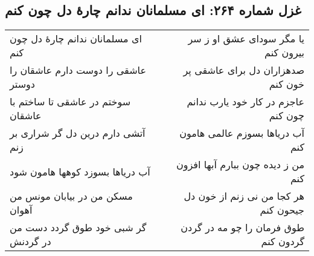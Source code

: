 \begin{center}
\section*{غزل شماره ۲۶۴: ای مسلمانان ندانم چارهٔ دل چون کنم}
\label{sec:264}
\begin{longtable}{l p{0.5cm} r}
ای مسلمانان ندانم چارهٔ دل چون کنم
&&
یا مگر سودای عشق او ز سر بیرون کنم
\\
عاشقی را دوست دارم عاشقان را دوستر
&&
صدهزاران دل برای عاشقی پر خون کنم
\\
سوختم در عاشقی تا ساختم با عاشقان
&&
عاجزم در کار خود یارب ندانم چون کنم
\\
آتشی دارم درین دل گر شراری بر زنم
&&
آب دریاها بسوزم عالمی هامون کنم
\\
آب دریاها بسوزد کوهها هامون شود
&&
من ز دیده چون ببارم آبها افزون کنم
\\
مسکن من در بیابان مونس من آهوان
&&
هر کجا من نی زنم از خون دل جیحون کنم
\\
گر شبی خود طوق گردد دست من در گردنش
&&
طوق فرمان را چو مه در گردن گردون کنم
\\
\end{longtable}
\end{center}
